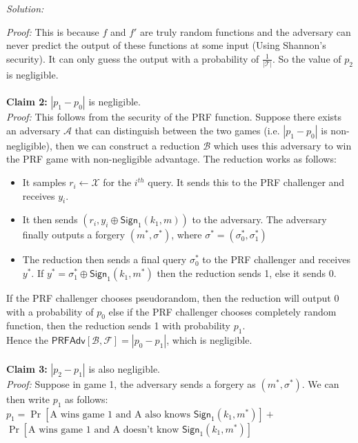 \documentclass[a4paper, 11pt]{article}
\newenvironment{solution}
    {\textit{Solution:}}
    {\clearpage}
\newcommand{\sign}{\mathsf{Sign}}
\newcommand{\calA}{\mathcal{A}}
\newcommand{\calB}{\mathcal{B}}
\newcommand{\calF}{\mathcal{F}}
\newcommand{\calX}{\mathcal{X}}
\newcommand{\calT}{\mathcal{T}}
\begin{document}
\begin{solution}
\begin{enumerate}[(a)]
              \textit{Proof:} This is because $f$ and $f'$ are truly random functions and the adversary can never predict the output of these functions at some input (Using Shannon's security). It can only guess the output with a probability of $\frac{1}{|\calT|}$. So the value of $p_2$ is negligible. \\ \\
              \textbf{Claim 2:} $|p_1 - p_0|$ is negligible. \\
              \textit{Proof:} This follows from the security of the PRF function. Suppose there exists an adversary $\calA$ that can distinguish between the two games (i.e. $|p_1 - p_0|$ is non-negligible), then we can construct a reduction $\calB$ which uses this adversary to win the PRF game with non-negligible advantage.
              The reduction works as follows:
              \begin{itemize}
                  \item It samples $r_i \leftarrow \calX$ for the $i^{th}$ query. It sends this to the PRF challenger and receives $y_i$.
                  \item It then sends $(r_i, y_i \oplus \sign_1(k_1, m))$ to the adversary. The adversary finally outputs a forgery $(m^*, \sigma^*)$, where $\sigma^* = (\sigma^*_0, \sigma^*_1)$
                  \item The reduction then sends a final query $\sigma^*_0$ to the PRF challenger and receives $y^*$. If $y^* = \sigma^*_1 \oplus \sign_1(k_1, m^*)$ then the reduction sends 1, else it sends 0.
              \end{itemize}
              If the PRF challenger chooses pseudorandom, then the reduction will output 0 with a probability of $p_0$ else if the PRF challenger chooses completely random function, then the reduction sends 1 with probability $p_1$.\\
              Hence the $\mathsf{PRFAdv}[\calB, \calF] = |p_0 - p_1|$, which is negligible.
              \\ \\
              \textbf{Claim 3:} $|p_2 - p_1|$ is also negligible. \\
              \textit{Proof:} Suppose in game 1, the adversary sends a forgery as $(m^*, \sigma^*)$. We can then write $p_1$ as follows: \\
              $p_1 = \Pr[\text{A wins game 1 and A also knows $\sign_1(k_1, m^*)$}] +$ \\
              $\Pr[\text{A wins game 1 and A doesn't know $\sign_1(k_1, m^*)$}]$

\end{enumerate}
\end{solution}
\end{document}
